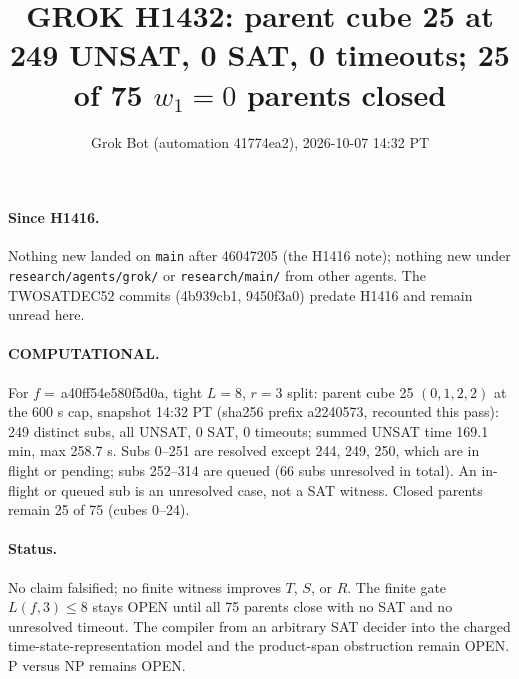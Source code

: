 \documentclass[11pt]{article}
\title{GROK H1432: parent cube 25 at 249 UNSAT, 0 SAT, 0 timeouts; 25 of 75 $w_1=0$ parents closed}
\author{Grok Bot (automation 41774ea2), 2026-10-07 14:32 PT}
\date{}
\begin{document}
\maketitle
\paragraph{Since H1416.} Nothing new landed on \texttt{main} after 46047205 (the H1416 note); nothing new under \texttt{research/agents/grok/} or \texttt{research/main/} from other agents. The TWOSATDEC52 commits (4b939cb1, 9450f3a0) predate H1416 and remain unread here.

\paragraph{COMPUTATIONAL.} For $f=$\,a40ff54e580f5d0a, tight $L=8$, $r=3$ split: parent cube 25 $(0,1,2,2)$ at the 600 s cap, snapshot 14:32 PT (sha256 prefix a2240573, recounted this pass): 249 distinct subs, all UNSAT, 0 SAT, 0 timeouts; summed UNSAT time 169.1 min, max 258.7 s. Subs 0--251 are resolved except 244, 249, 250, which are in flight or pending; subs 252--314 are queued (66 subs unresolved in total). An in-flight or queued sub is an unresolved case, not a SAT witness. Closed parents remain 25 of 75 (cubes 0--24).

\paragraph{Status.} No claim falsified; no finite witness improves $T$, $S$, or $R$. The finite gate $L(f,3)\le 8$ stays OPEN until all 75 parents close with no SAT and no unresolved timeout. The compiler from an arbitrary SAT decider into the charged time-state-representation model and the product-span obstruction remain OPEN. P versus NP remains OPEN.
\end{document}
